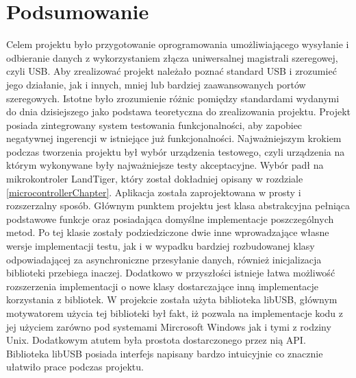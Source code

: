\documentclass{BscUS}
\begin{document}
\chapter{Podsumowanie}
\label{ConclusionChapter}
\indent Celem projektu było przygotowanie oprogramowania umożliwiającego wysyłanie i odbieranie danych z wykorzystaniem złącza uniwersalnej magistrali szeregowej, czyli USB. Aby zrealizować projekt należało poznać standard USB i zrozumieć jego działanie, jak i innych, mniej lub bardziej zaawansowanych portów szeregowych. Istotne było zrozumienie różnic pomiędzy standardami wydanymi do dnia dzisiejszego jako podstawa teoretyczna do zrealizowania projektu. Projekt posiada zintegrowany system testowania funkcjonalności, aby zapobiec negatywnej ingerencji w istniejące już funkcjonalności.
\newline
\indent Najważniejszym krokiem podczas tworzenia projektu był wybór urządzenia testowego, czyli urządzenia na którym wykonywane były najważniejsze testy akceptacyjne. Wybór padł na mikrokontroler LandTiger, który został dokładniej opisany w rozdziale \ref{microcontrollerChapter}. Aplikacja została zaprojektowana w prosty i rozszerzalny sposób. Głównym punktem projektu jest klasa abstrakcyjna pełniąca podstawowe funkcje oraz posiadająca domyślne implementacje poszczególnych metod. Po tej klasie zostały podziedziczone dwie inne wprowadzające własne wersje implementacji testu, jak i w wypadku bardziej rozbudowanej klasy odpowiadającej za asynchroniczne przesyłanie danych, również inicjalizacja biblioteki przebiega inaczej. Dodatkowo w przyszłości istnieje łatwa możliwość rozszerzenia implementacji o nowe klasy dostarczające inną implementacje korzystania z bibliotek.
\newline
\indent W projekcie została użyta biblioteka libUSB, głównym motywatorem użycia tej biblioteki był fakt, iż pozwala na implementacje kodu z jej użyciem zarówno pod systemami Mircrosoft Windows jak i tymi z rodziny Unix. Dodatkowym atutem była prostota dostarczonego przez nią API. Biblioteka libUSB posiada interfejs napisany bardzo intuicyjnie co znacznie ułatwiło prace podczas projektu.
\newline
\end{document}
